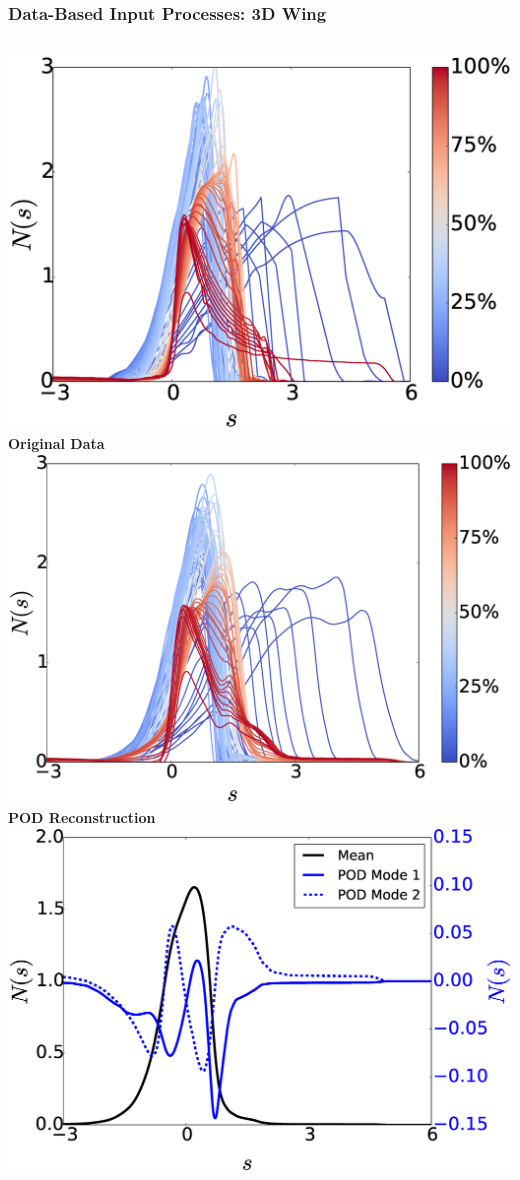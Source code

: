 \documentclass[9pt]{beamer}
\begin{document}
\begin{frame}
\frametitle{Data-Based Input Processes: 3D Wing}
\label{sec-3-3}

\begin{columns}[c]
    \centering
    \includegraphics[width=1.3\textwidth]{HornsUnaligned} \\
    \bf{Original Data}
    \centering
    \includegraphics[width=1.25\textwidth]{PODReconstruction2} \\
    {\bf POD Reconstruction}
    \centering
    \includegraphics[width=1.25\textwidth]{PODModes} \\

\end{columns}
\end{frame}
\end{document}
